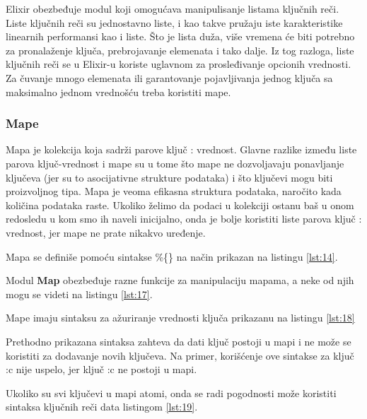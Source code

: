 \documentclass[12pt,oneside]{memoir}
\begin{document}
Elixir obezbeđuje modul koji omogućava manipulisanje listama ključnih reči. Liste ključnih reči su jednostavno liste, i kao takve pružaju iste karakteristike linearnih performansi kao i liste. Što je lista duža, više vremena će biti potrebno za pronalaženje ključa, prebrojavanje elemenata i tako dalje. Iz tog razloga, liste ključnih reči se u Elixir-u koriste uglavnom za prosleđivanje opcionih vrednosti. Za čuvanje mnogo elemenata ili garantovanje pojavljivanja jednog ključa sa maksimalno jednom vrednošću treba koristiti mape.
 
\subsubsection{Mape}
Mapa je kolekcija koja sadrži parove ključ : vrednost. Glavne razlike između liste parova ključ-vrednost i mape su u tome što mape ne dozvoljavaju ponavljanje ključeva (jer su to asocijativne strukture podataka) i što ključevi mogu biti proizvoljnog tipa. Mapa je veoma efikasna struktura podataka, naročito kada količina podataka raste. Ukoliko želimo da podaci u kolekciji ostanu baš u onom redosledu u kom smo ih naveli inicijalno, onda je bolje koristiti liste parova ključ : vrednost, jer mape ne prate nikakvo uređenje.

Mapa se definiše pomoću sintakse \%\{\} na način prikazan na listingu \ref{lst:14}.



Modul \textbf{Map} obezbeđuje razne funkcije za manipulaciju mapama, a neke od njih mogu se videti na listingu \ref{lst:17}.



Mape imaju sintaksu za ažuriranje vrednosti ključa prikazanu na listingu \ref{lst:18}



\noindent Prethodno prikazana sintaksa zahteva da dati ključ postoji u mapi i ne može se koristiti za dodavanje novih ključeva. Na primer, korišćenje ove sintakse za ključ :c nije uspelo, jer ključ :c ne postoji u mapi.



Ukoliko su svi ključevi u mapi atomi, onda se radi pogodnosti može koristiti sintaksa ključnih reči data listingom \ref{lst:19}.
\end{document}
